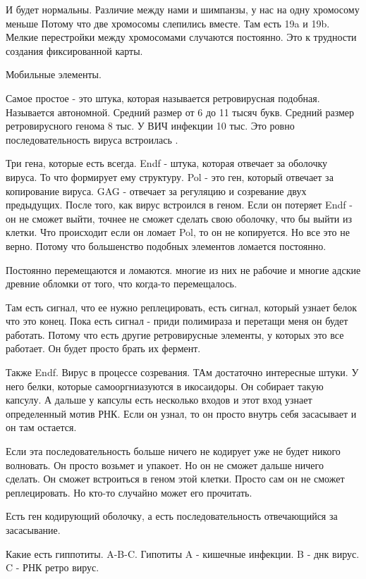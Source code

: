 И будет нормальны. Различие между нами и шимпанзы, у нас на одну хромосому меньше
Потому что две хромосомы слепились вместе. Там есть 19a и 19b. Мелкие 
перестройки между хромосомами случаются постоянно. Это к трудности 
создания фиксированной карты. 

Мобильные элементы. 

Самое простое - это штука, которая называется 
ретровирусная подобная. Называется автономной. 
Средний размер от 6 до 11 тысяч букв. Средний 
размер ретровирусного генома 8 тыс. У ВИЧ 
инфекции 10 тыс. Это ровно последовательность 
вируса встроилась . 

Три гена, которые есть всегда. Endf - штука, 
которая отвечает за оболочку вируса. То что формирует ему структуру. 
Pol - это ген, который отвечает за копирование вируса. GAG - отвечает 
за регуляцию и созревание двух предыдущих. После того, 
как вирус встроился в геном. Если он потеряет Endf - он не 
сможет выйти, точнее не сможет сделать свою 
оболочку, что бы выйти из клетки. Что происходит если он 
ломает Pol, то он не копируется. Но все это не верно. 
Потому что большенство подобных элементов ломается постоянно. 

Постоянно перемещаются и ломаются. многие из них не рабочие и 
многие адские древние обломки от того, что когда-то перемещалось. 

Там есть сигнал, что ее нужно реплецировать, есть 
сигнал, который узнает белок что это конец. Пока есть 
сигнал - приди полимираза и перетащи меня он будет 
работать. Потому что есть другие ретровирусные элементы, 
у которых это все работает. Он будет просто брать их фермент. 

Также Endf. Вирус в процессе созревания. ТАм достаточно интересные штуки. 
У него белки, которые самооргниазуются в икосаидоры. Он собирает 
такую капсулу. А дальше у капсулы есть несколько входов и 
этот вход узнает определенный мотив РНК. Если он узнал, то 
он просто внутрь себя засасывает и он там остается. 

Если эта последовательность больше ничего не кодирует уже не будет никого волновать. 
Он просто возьмет и упакоет. 
Но он не сможет дальше ничего сделать. Он сможет встроиться в геном этой 
клетки. Просто сам он не сможет реплецировать. Но кто-то случайно может его прочитать. 

Есть ген кодирующий оболочку, а есть последовательность 
отвечающийся за засасывание. 

Какие есть гиппотиты. A-B-C. Гипотиты A - кишечные инфекции. B - днк вирус. C - РНК ретро вирус. 

